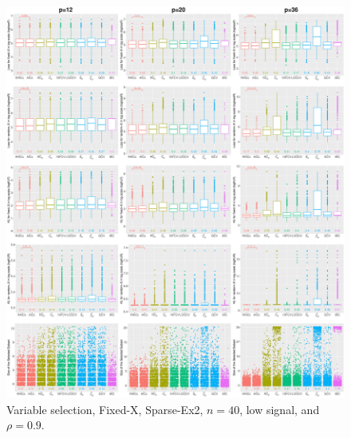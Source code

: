 \begin{figure}[!ht]
\centering
\includegraphics[width=\textwidth]{figures/supplement/fixedx/subset_selection/Sparse-Ex2_n40_lsnr_rho09.eps}
\caption{Variable selection, Fixed-X, Sparse-Ex2, $n=40$, low signal, and $\rho=0.9$.}
\end{figure}
\clearpage
